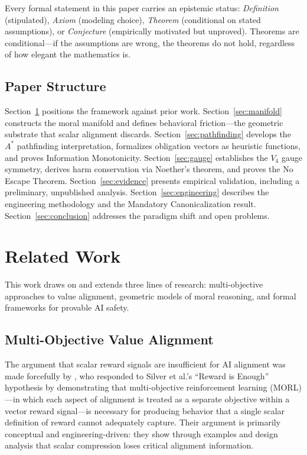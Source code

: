 \documentclass[12pt]{article}
\theoremstyle{definition}
\theoremstyle{remark}
\begin{document}
Every formal statement in this paper carries an epistemic status: \emph{Definition} (stipulated), \emph{Axiom} (modeling choice), \emph{Theorem} (conditional on stated assumptions), or \emph{Conjecture} (empirically motivated but unproved). Theorems are conditional---if the assumptions are wrong, the theorems do not hold, regardless of how elegant the mathematics is.

\subsection{Paper Structure}

Section~\ref{sec:related} positions the framework against prior work. Section~\ref{sec:manifold} constructs the moral manifold and defines behavioral friction---the geometric substrate that scalar alignment discards. Section~\ref{sec:pathfinding} develops the $A^*$ pathfinding interpretation, formalizes obligation vectors as heuristic functions, and proves Information Monotonicity. Section~\ref{sec:gauge} establishes the $V_4$ gauge symmetry, derives harm conservation via Noether's theorem, and proves the No Escape Theorem. Section~\ref{sec:evidence} presents empirical validation, including a preliminary, unpublished analysis. Section~\ref{sec:engineering} describes the engineering methodology and the Mandatory Canonicalization result. Section~\ref{sec:conclusion} addresses the paradigm shift and open problems.


\section{Related Work}
\label{sec:related}

This work draws on and extends three lines of research: multi-objective approaches to value alignment, geometric models of moral reasoning, and formal frameworks for provable AI safety.

\subsection{Multi-Objective Value Alignment}

The argument that scalar reward signals are insufficient for AI alignment was made forcefully by \citet{vamplew2022}, who responded to Silver et al.'s ``Reward is Enough'' hypothesis by demonstrating that multi-objective reinforcement learning (MORL)---in which each aspect of alignment is treated as a separate objective within a vector reward signal---is necessary for producing behavior that a single scalar definition of reward cannot adequately capture. Their argument is primarily conceptual and engineering-driven: they show through examples and design analysis that scalar compression loses critical alignment information.
\end{document}
